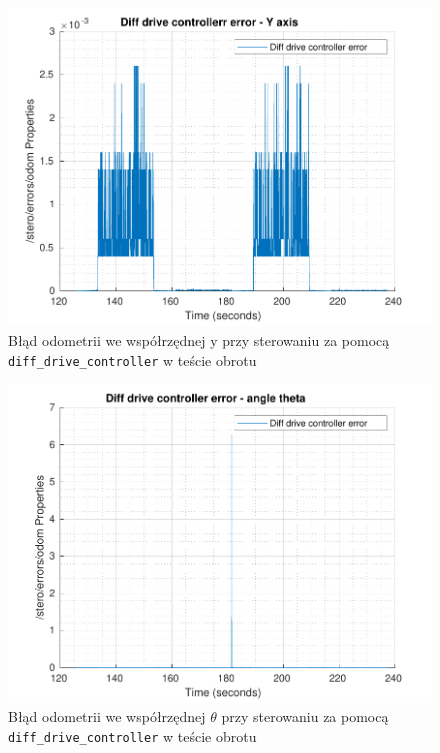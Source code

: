 \documentclass{mwrep}
\begin{document}
\begin{figure}[H]
	\centering
	\includegraphics[scale=0.85]{./figures/pro1/square_diff/square_diff_y.pdf}
	\caption{Błąd odometrii we współrzędnej y przy sterowaniu za pomocą \texttt{diff\_{}drive\_{}controller} w teście obrotu}
\end{figure}

\begin{figure}[H]
	\centering
	\includegraphics[scale=0.85]{./figures/pro1/square_diff/square_diff_theta.pdf}
	\caption{Błąd odometrii we współrzędnej $\theta$ przy sterowaniu za pomocą \texttt{diff\_{}drive\_{}controller} w teście obrotu}
\end{figure}
\end{document}
